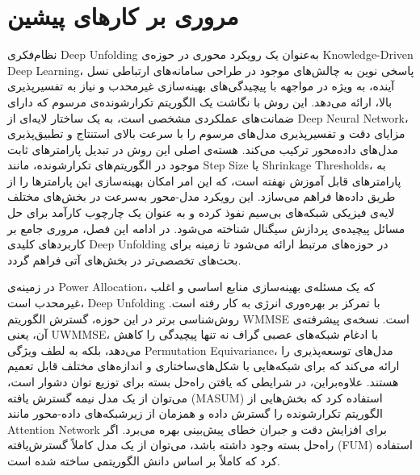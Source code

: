 \chapter{مروری بر کارهای پیشین}
\label{chap:related}

نظام‌فکری 
\gls{Deep Unfolding}
 به‌عنوان یک رویکرد محوری در حوزه‌ی 
\gls{Knowledge-Driven Deep Learning}،
  پاسخی نوین به چالش‌های موجود در طراحی سامانه‌های ارتباطی نسل آینده، به ویژه در مواجهه با پیچیدگی‌های بهینه‌سازی غیرمحدب و نیاز به تفسیرپذیری بالا، ارائه می‌دهد. این روش با نگاشت یک الگوریتم تکرارشونده‌ی مرسوم که دارای ضمانت‌های عملکردی مشخصی است، به یک ساختار لایه‌ای از 
\gls{Deep Neural Network}،
 مزایای دقت و تفسیرپذیری مدل‌های مرسوم را با سرعت بالای استنتاج و تطبیق‌پذیری مدل‌های داده‌محور ترکیب می‌کند. هسته‌ی اصلی این روش در تبدیل پارامترهای ثابت موجود در الگوریتم‌های تکرارشونده، مانند 
\gls{Step Size}
 یا 
\glspl{Shrinkage Threshold}،
  به پارامترهای قابل آموزش نهفته است، که این امر امکان بهینه‌سازی این پارامترها را از طریق داده‌ها فراهم می‌سازد.
این رویکرد مدل-محور به‌سرعت در بخش‌های مختلف لایه‌ی فیزیکی شبکه‌های بی‌سیم نفوذ کرده و به عنوان یک چارچوب کارآمد برای حل مسائل پیچیده‌ی پردازش سیگنال شناخته می‌شود. در ادامه این فصل، مروری جامع بر کاربردهای کلیدی 
\gls{Deep Unfolding}
 در حوزه‌های مرتبط ارائه می‌شود تا زمینه برای بحث‌های تخصصی‌تر در بخش‌های آتی فراهم گردد.
 
 در زمینه‌ی 
\gls{Power Allocation}،
 که یک مسئله‌ی بهینه‌سازی منابع اساسی و اغلب غیرمحدب است، 
\gls{Deep Unfolding}
 با تمرکز بر بهره‌وری انرژی به کار رفته است. روش‌شناسی برتر در این حوزه، گسترش الگوریتم 
\gls{WMMSE}
 است. نسخه‌ی پیشرفته‌ی آن، یعنی 
\gls{UWMMSE}،
 با ادغام شبکه‌های عصبی گراف نه تنها پیچیدگی را کاهش می‌دهد، بلکه به لطف ویژگی 
\gls{Permutation Equivariance}،
  مدل‌های توسعه‌پذیری را ارائه می‌کند که برای شبکه‌هایی با شکل‌‌های‌ساختاری‌ و اندازه‌های مختلف قابل تعمیم هستند. علاوه‌براین، در شرایطی که یافتن راه‌حل بسته برای توزیع توان دشوار است، می‌توان از یک مدل نیمه گسترش یافته 
(\gls{MASUM})
   استفاده کرد که بخش‌هایی از الگوریتم تکرارشونده را گسترش داده و همزمان از زیرشبکه‌های داده-محور مانند 
\gls{Attention Network}
  برای افزایش دقت و جبران خطای پیش‌بینی بهره می‌برد. اگر راه‌حل بسته وجود داشته باشد، می‌توان از یک مدل کاملاً گسترش‌یافته 
(\gls{FUM})
   استفاده کرد که کاملاً بر اساس دانش الگوریتمی ساخته شده است.

